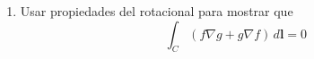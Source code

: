 \documentclass{article}
\begin{document}
\begin{enumerate}
{            \color{azul}
           
        }
        
        \item {
            Usar propiedades del rotacional para mostrar que
            \[
                \int_C {{\left(f \nabla g + g \nabla f\right)}\,d\mathbf{l}} = 0
            \]
         

            \color{azul}
           
        }
    \end{enumerate}
\end{document}
